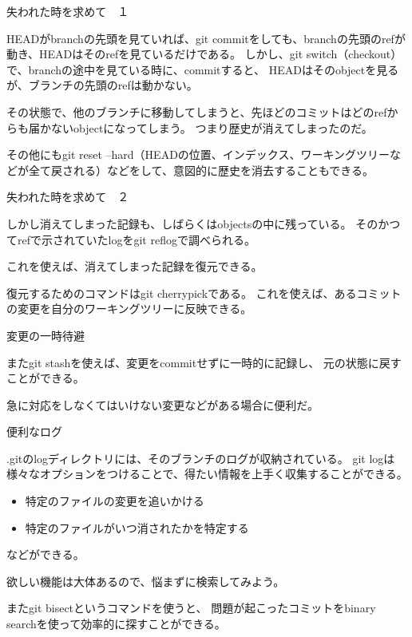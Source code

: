 \documentclass[12pt, unicode]{beamer}
\begin{document}
\begin{frame}{失われた時を求めて　１}

HEADがbranchの先頭を見ていれば、git commitをしても、branchの先頭のrefが動き、HEADはそのrefを見ているだけである。
しかし、git switch（checkout）で、branchの途中を見ている時に、commitすると、
HEADはそのobjectを見るが、ブランチの先頭のrefは動かない。

その状態で、他のブランチに移動してしまうと、先ほどのコミットはどのrefからも届かないobjectになってしまう。
つまり歴史が消えてしまったのだ。

その他にもgit reset --hard（HEADの位置、インデックス、ワーキングツリーなどが全て戻される）などをして、意図的に歴史を消去することもできる。

\end{frame}
\begin{frame}{失われた時を求めて　２}

しかし消えてしまった記録も、しばらくはobjectsの中に残っている。
そのかつてrefで示されていたlogをgit reflogで調べられる。

これを使えば、消えてしまった記録を復元できる。

復元するためのコマンドはgit cherrypickである。
これを使えば、あるコミットの変更を自分のワーキングツリーに反映できる。


\end{frame}
\begin{frame}{変更の一時待避}

またgit stashを使えば、変更をcommitせずに一時的に記録し、
元の状態に戻すことができる。

急に対応をしなくてはいけない変更などがある場合に便利だ。

\end{frame}
\begin{frame}{便利なログ}

.gitのlogディレクトリには、そのブランチのログが収納されている。
git logは様々なオプションをつけることで、得たい情報を上手く収集することができる。

\begin{itemize}
\item 特定のファイルの変更を追いかける
\item 特定のファイルがいつ消されたかを特定する
\end{itemize}

などができる。

欲しい機能は大体あるので、悩まずに検索してみよう。

またgit bisectというコマンドを使うと、
問題が起こったコミットをbinary searchを使って効率的に探すことができる。

\end{frame}
\end{document}
